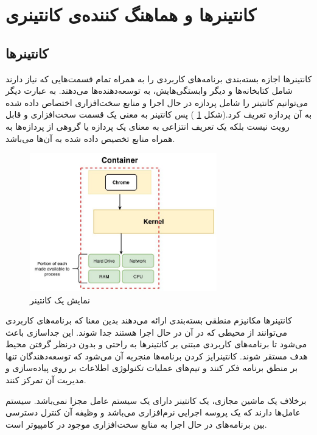 \newpage

\section{کانتینرها و هماهنگ کننده‌ی کانتینری}

\subsection{کانتینرها}

کانتینرها اجازه بسته‌بندی برنامه‌های کاربردی را به همراه تمام قسمت‌هایی که نیاز دارند شامل کتابخانه‌ها و دیگر وابستگی‌هایش، به توسعه‌دهنده‌ها می‌دهند. به عبارت دیگر می‌توانیم کانتینر را شامل پردازه در حال اجرا و منابع سخت‌افزاری اختصاص داده شده به آن پردازه تعریف کرد.(شکل
\ref{تصویر 2-1}
) پس کانتینر به معنی یک قسمت سخت‌افزاری و قابل رویت نیست بلکه یک تعریف انتزاعی به معنای یک پردازه یا گروهی از پردازه‌ها به همراه منابع تخصیص داده شده به آن‌ها می‌باشد. 

\begin{figure}[!h]
	\centering
	\includegraphics[height=6cm]{images/container}
	\caption{نمایش یک کانتینر}
	\label{تصویر 2-1}
\end{figure}

کانتینرها مکانیزم منطقی بسته‌بندی ارائه می‌دهند بدین معنا که برنامه‌های کاربردی می‌توانند از محیطی که در آن در حال اجرا هستند جدا شوند. این جداسازی باعث می‌شود تا برنامه‌های کاربردی مبتنی بر کانتینرها به راحتی و بدون درنظر گرفتن محیط هدف مستقر شوند. کانتینرایز کردن برنامه‌ها منجربه آن می‌شود که توسعه‌دهندگان تنها بر منطق برنامه فکر کنند و تیم‌های عملیات تکنولوژی اطلاعات بر روی پیاده‌سازی و مدیریت آن تمرکز کنند.

برخلاف یک ماشین مجازی، یک کانتینر دارای یک سیستم عامل مجزا نمی‌باشد. سیستم عامل‌ها
دارند که یک پروسه اجرایی نرم‌افزاری می‌باشد و وظیفه آن کنترل دسترسی بین برنامه‌های در حال اجرا به منابع سخت‌افزاری موجود در کامپیوتر است.

